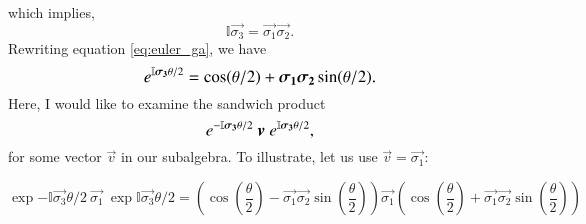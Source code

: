 which implies,
$$ \mathbb{I} \vec{\sigma_3 } = \vec{\sigma_1 } \vec{\sigma_2 }. $$
Rewriting equation \eqref{eq:euler_ga}, we have
\begin{equation} \label{eq:euler_ga_rewritten}
	\large  \exp{ \mathbb{I} \vec{\sigma_3} \theta / 2} = \cos(\theta/2) + \vec{\sigma_1} \vec{\sigma_2} \sin(\theta/2).
\end{equation}
Here, I would like to examine the sandwich product
\begin{equation} \label{eq:sandwich_product}
	\large  \exp{ -\mathbb{I} \vec{\sigma_3}  \theta / 2} \ \vec{v}  \
	\exp{ \mathbb{I} \vec{\sigma_3} \theta / 2},
\end{equation}
for some vector $\vec{v}$ in our subalgebra. To illustrate, let us use $\vec{v} =  \vec{\sigma_1}$:

$$ 	\exp{ -\mathbb{I} \vec{\sigma_3} \theta / 2} \ \vec{\sigma_1}  \
\exp{ \mathbb{I} \vec{\sigma_3} \theta / 2}  = \left(  \cos(\frac{\theta}{2}) - \vec{\sigma_1} \vec{\sigma_2} \sin(\frac{\theta}{2}) \right) \vec{\sigma_1} \left(  \cos(\frac{\theta}{2}) + \vec  {\sigma_1} \vec{\sigma_2} \sin(\frac{\theta}{2}) \right) $$
